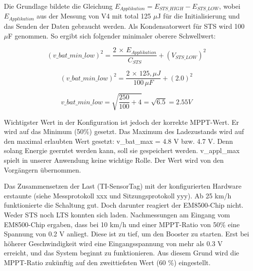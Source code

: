 Die Grundlage bildete die Gleichung  $E_{Applikation}= E_{STS\_HIGH} - E_{STS\_LOW}$, wobei  $E_{Applikation}$ aus der Messung von V4 mit total 125 $\mu$J für die Initialisierung und das Senden der Daten gebraucht werden. Als Kondensatorwert für STS wird 100 $\mu$F genommen. So ergibt sich folgender minimaler oberere Schwellwert:

\begin{equation}
(v\_bat\_min\_low) ^2  =  \frac{2\, \times \, E_{Applikation}}{C_{STS}} + (V_{STS\_LOW})^2
\end{equation}

\begin{equation}
(v\_bat\_min\_low) ^2  =  \frac{2\, \times \, 125, \mu J}{100 \,\mu F} + (2.0)^2
\end{equation}

\begin{equation}
v\_bat\_min\_low  =  \sqrt{\frac{250}{100 } + 4} = \sqrt{6.5} = 2.55 V
\end{equation}

Wichtigster Wert in der Konfiguration ist jedoch der korrekte MPPT-Wert. Er wird auf das Minimum (50\thinspace\%) gesetzt. Das Maximum des Ladezustands  wird auf den maximal erlaubten Wert gesetzt: v\_bat\_max  = 4.8 V bzw. 4.7 V. Denn solang Energie geerntet werden kann, soll sie gespeichert werden. v\_appl\_max spielt in unserer Anwendung keine wichtige Rolle. Der Wert wird von den Vorgängern übernommen.

Das Zusammensetzen der Last (TI-SensorTag) mit der konfigurierten Hardware erstaunte (siehe Messprotokoll xxx und Sitzungsprotokoll yyy). Ab 25 km/h funktionierte die Schaltung gut. Doch darunter reagiert der EM8500-Chip nicht. Weder STS noch LTS konnten sich laden. Nachmessungen am Eingang vom EM8500-Chip ergaben, dass bei  10 km/h und einer MPPT-Ratio von 50\thinspace\% eine Spannung von 0.2 V anliegt. Diese ist zu tief, um den Booster zu starten. Erst bei höherer Geschwindigkeit wird eine Eingangsspannung von mehr als 0.3 V erreicht, und das System beginnt zu funktionieren. Aus diesem Grund wird die MPPT-Ratio zukünftig auf den zweittiefsten Wert (60 \thinspace\%) eingestellt.


